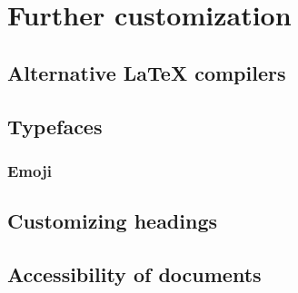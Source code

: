 \chapter{Further customization}

\section{Alternative \LaTeX{} compilers}

\section{Typefaces}\label{sec:typefaces}


\subsection{Emoji}\label{sec:emoji}

\section{Customizing headings}

\section{Accessibility of documents}
